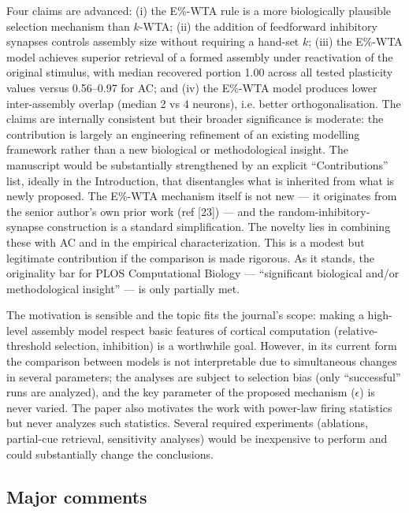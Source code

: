 \documentclass[a4paper, 11pt]{article}
\begin{document}
Four claims are advanced: (i) the E\%-WTA rule is a more biologically plausible selection mechanism than $k$-WTA; (ii) the addition of feedforward inhibitory synapses controls assembly size without requiring a hand-set $k$; (iii) the E\%-WTA model achieves superior retrieval of a formed assembly under reactivation of the original stimulus, with median recovered portion 1.00 across all tested plasticity values versus 0.56–0.97 for AC; and (iv) the E\%-WTA model produces lower inter-assembly overlap (median 2 vs 4 neurons), i.e. better orthogonalisation. The claims are internally consistent but their broader significance is moderate: the contribution is largely an engineering refinement of an existing modelling framework rather than a new biological or methodological insight. The manuscript would be substantially strengthened by an explicit ``Contributions'' list, ideally in the Introduction, that disentangles what is inherited from what is newly proposed. The E\%-WTA mechanism itself is not new — it originates from the senior author's own prior work (ref [23]) — and the random-inhibitory-synapse construction is a standard simplification. The novelty lies in combining these with AC and in the empirical characterization. This is a modest but legitimate contribution if the comparison is made rigorous. As it stands, the originality bar for PLOS Computational Biology — ``significant biological and/or methodological insight'' — is only partially met.

The motivation is sensible and the topic fits the journal's scope: making a high-level assembly model respect basic features of cortical computation (relative-threshold selection, inhibition) is a worthwhile goal. However, in its current form the comparison between models is not interpretable due to simultaneous changes in several parameters; the analyses are subject to selection bias (only ``successful'' runs are analyzed), and the key parameter of the proposed mechanism ($\epsilon$) is never varied. The paper also motivates the work with power-law firing statistics but never analyzes such statistics. Several required experiments (ablations, partial-cue retrieval, sensitivity analyses) would be inexpensive to perform and could substantially change the conclusions.

\subsection*{Major comments}
\end{document}
